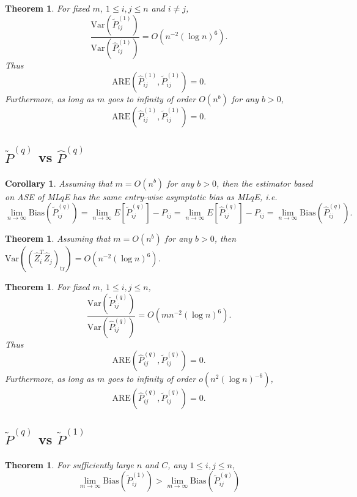 \documentclass[a4paper]{article}
\newtheorem{theorem}[fact]{Theorem}
\newtheorem{corollary}[fact]{Corollary}
\begin{document}
\begin{theorem}
\label{thm:AREL1}
For fixed $m$, $1 \le i, j \le n$ and $i \ne j$,
\[
	\frac{\mathrm{Var}(\widetilde{P}_{ij}^{(1)})}{\mathrm{Var}(\hat{P}_{ij}^{(1)})}
    = O(n^{-2} (\log n)^6).
\]
Thus
\[
	\mathrm{ARE}(\hat{P}_{ij}^{(1)}, \widetilde{P}_{ij}^{(1)}) = 0.
\]
Furthermore, as long as $m$ goes to infinity of order $O(n^b)$ for any $b > 0$,
\[
	\mathrm{ARE}(\hat{P}_{ij}^{(1)}, \widetilde{P}_{ij}^{(1)}) = 0.
\]
\end{theorem}





\subsection{$\widetilde{P}^{(q)}$ vs $\hat{P}^{(q)}$}
\begin{corollary}
\label{cor:LqConsistent}
Assuming that $m = O(n^b)$ for any $b > 0$, then the estimator based on ASE of ML$q$E has the same entry-wise asymptotic bias as ML$q$E, i.e.
\[
	\lim_{n \to \infty} \mathrm{Bias}(\widetilde{P}_{ij}^{(q)}) = \lim_{n \to \infty} E[\widetilde{P}_{ij}^{(q)}] - P_{ij} = \lim_{n \to \infty} E[\hat{P}^{(q)}_{ij}] - P_{ij}
    = \lim_{n \to \infty} \mathrm{Bias}(\hat{P}_{ij}^{(q)}).
\]
\end{corollary}

\begin{theorem}
\label{thm:VarASELq}
Assuming that $m = O(n^b)$ for any $b > 0$, then $\mathrm{Var}((\hat{Z}_i^T \hat{Z}_j)_{\mathrm{tr}}) = O(n^{-2} (\log n)^6)$.
\end{theorem}

\begin{theorem}
\label{thm:ARELq}
For fixed $m$, $1 \le i, j \le n$,
\[
	\frac{\mathrm{Var}(\widetilde{P}_{ij}^{(q)})}{\mathrm{Var}(\hat{P}_{ij}^{(q)})}
    = O(m n^{-2} (\log n)^6).
\]
Thus
\[
	\mathrm{ARE}(\hat{P}_{ij}^{(q)}, \widetilde{P}_{ij}^{(q)}) = 0.
\]
Furthermore, as long as $m$ goes to infinity of order $o(n^2 (\log n)^{-6})$,
\[
	\mathrm{ARE}(\hat{P}_{ij}^{(q)}, \widetilde{P}_{ij}^{(q)}) = 0.
\]
\end{theorem}




\subsection{$\widetilde{P}^{(q)}$ vs $\widetilde{P}^{(1)}$}

\begin{theorem}
\label{thm:biasL1andLq}
For sufficiently large $n$ and $C$, any $1 \le i,j \le n$,
\[
	\lim_{m \to \infty} \mathrm{Bias}(\widetilde{P}_{ij}^{(1)})
    > \lim_{m \to \infty} \mathrm{Bias}(\widetilde{P}_{ij}^{(q)})
\]
\end{theorem}
\end{document}

